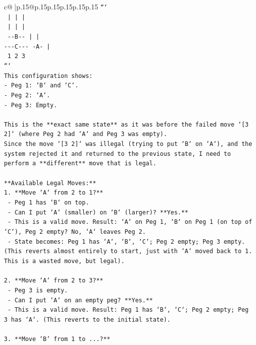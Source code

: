 \documentclass{article}
\begin{document}
{\begin{supertabular}{c@{$\;$}|p{.15\linewidth}@{}p{.15\linewidth}p{.15\linewidth}p{.15\linewidth}p{.15\linewidth}p{.15\linewidth}}
{{{\texttt{```} \\
\texttt{   |       |       |   } \\
\texttt{   |       |       |   } \\
\texttt{ {-}{-}B{-}{-}     |       |   } \\
\texttt{{-}{-}{-}C{-}{-}{-}   {-}A{-}      |   } \\
\texttt{   1       2       3   } \\
\texttt{```} \\
\texttt{This configuration shows:} \\
\texttt{{-} Peg 1: `B` and `C`.} \\
\texttt{{-} Peg 2: `A`.} \\
\texttt{{-} Peg 3: Empty.} \\
\\ 
\texttt{This is the **exact same state** as it was before the failed move `{[}3 2{]}` (where Peg 2 had `A` and Peg 3 was empty).} \\
\texttt{Since the move `{[}3 2{]}` was illegal (trying to put `B` on `A`), and the system rejected it and returned to the previous state, I need to perform a **different** move that is legal.} \\
\\ 
\texttt{**Available Legal Moves:**} \\
\texttt{1. **Move `A` from 2 to 1?**} \\
\texttt{   {-} Peg 1 has `B` on top.} \\
\texttt{   {-} Can I put `A` (smaller) on `B` (larger)? **Yes.**} \\
\texttt{   {-} This is a valid move. Result: `A` on Peg 1, `B` on Peg 1 (on top of `C`), Peg 2 empty? No, `A` leaves Peg 2.} \\
\texttt{   {-} State becomes: Peg 1 has `A`, `B`, `C`; Peg 2 empty; Peg 3 empty. (This reverts almost entirely to start, just with `A` moved back to 1. This is a wasted move, but legal).} \\
\\ 
\texttt{2. **Move `A` from 2 to 3?**} \\
\texttt{   {-} Peg 3 is empty.} \\
\texttt{   {-} Can I put `A` on an empty peg? **Yes.**} \\
\texttt{   {-} This is a valid move. Result: Peg 1 has `B`, `C`; Peg 2 empty; Peg 3 has `A`. (This reverts to the initial state).} \\
\\ 
\texttt{3. **Move `B` from 1 to ...?**} \\
}}}
\end{supertabular}}
\end{document}

